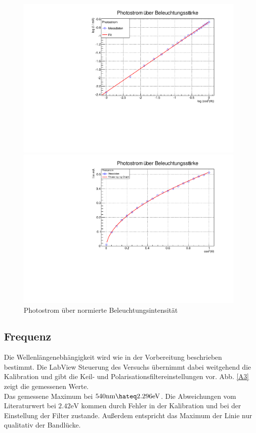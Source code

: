 \begin{figure}[hb]
\label{fig:A2}
\centering
\includegraphics[scale=0.4]{../A2/A2_log.pdf}

\includegraphics[scale=0.4]{../A2/A2_lin.pdf}

\caption{Photostrom über normierte Beleuchtungsintensität}
\end{figure}

\FloatBarrier
\subsection{Frequenz}

Die Wellenlängenebhängigkeit wird wie in der Vorbereitung beschrieben bestimmt. Die LabView Steuerung des Versuchs übernimmt dabei weitgehend die Kalibration und gibt die Keil- und Polarisationsfiltereinstellungen vor.
Abb. \ref{A3} zeigt die gemessenen Werte.\\
Das gemessene Maximum bei $540 \text{nm} \hateq 2.296 \text{eV}$. Die Abweichungen vom Literaturwert bei $2.42 \text{eV}$ kommen durch Fehler in der Kalibration und bei der Einstellung der Filter zustande. Außerdem entspricht das Maximum der Linie nur qualitativ der Bandlücke.


